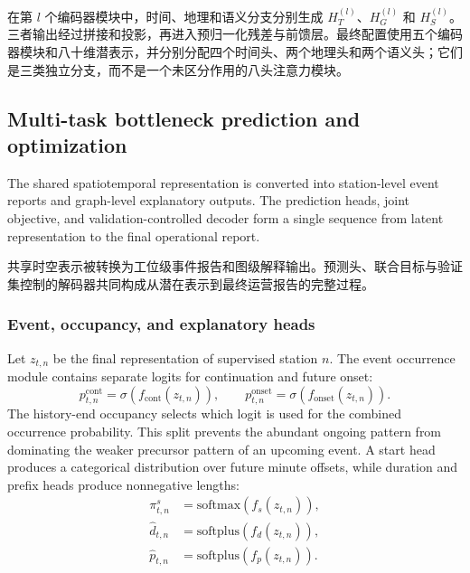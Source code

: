\documentclass[a4paper,fleqn]{cas-dc}
\newcommand{\zhpara}[1]{%
  \par\begingroup\small\color{black!72}\noindent #1\par\endgroup}
\begin{document}
\zhpara{在第 $l$ 个编码器模块中，时间、地理和语义分支分别生成 $H_T^{(l)}$、$H_G^{(l)}$ 和 $H_S^{(l)}$。三者输出经过拼接和投影，再进入预归一化残差与前馈层。最终配置使用五个编码器模块和八十维潜表示，并分别分配四个时间头、两个地理头和两个语义头；它们是三类独立分支，而不是一个未区分作用的八头注意力模块。}

\subsection{Multi-task bottleneck prediction and optimization}

The shared spatiotemporal representation is converted into station-level event reports and graph-level explanatory outputs. The prediction heads, joint objective, and validation-controlled decoder form a single sequence from latent representation to the final operational report.

\zhpara{共享时空表示被转换为工位级事件报告和图级解释输出。预测头、联合目标与验证集控制的解码器共同构成从潜在表示到最终运营报告的完整过程。}

\subsubsection{Event, occupancy, and explanatory heads}

Let $z_{t,n}$ be the final representation of supervised station $n$. The event occurrence module contains separate logits for continuation and future onset:
\begin{equation}
p^{\mathrm{cont}}_{t,n}=\sigma(f_{\mathrm{cont}}(z_{t,n})),
\qquad
p^{\mathrm{onset}}_{t,n}=\sigma(f_{\mathrm{onset}}(z_{t,n})).
\end{equation}
The history-end occupancy selects which logit is used for the combined occurrence probability. This split prevents the abundant ongoing pattern from dominating the weaker precursor pattern of an upcoming event. A start head produces a categorical distribution over future minute offsets, while duration and prefix heads produce nonnegative lengths:
\begin{equation}
\begin{aligned}
\pi^s_{t,n}&=\mathrm{softmax}(f_s(z_{t,n})),\\
\hat d_{t,n}&=\mathrm{softplus}(f_d(z_{t,n})),\\
\hat p_{t,n}&=\mathrm{softplus}(f_p(z_{t,n})).
\end{aligned}
\end{equation}
\end{document}
